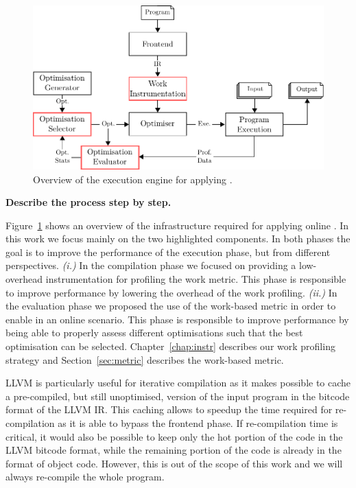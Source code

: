 \begin{figure}[htb]
    \centering
    \includegraphics[width=\linewidth]{figs/infra-diagram}
    \caption{Overview of the execution engine for applying {\itercomp}.}
    \label{fig:infra-diagram}
\end{figure}
\textbf{Describe the process step by step.}

Figure~\ref{fig:infra-diagram} shows an overview of the infrastructure required for applying online {\itercomp}.
In this work we focus mainly on the two highlighted components.
In both phases the goal is to improve the performance of the execution phase, but from different perspectives.
\textit{(i.)} In the compilation phase we focused on providing a low-overhead instrumentation for profiling the work metric. This phase is responsible to improve performance by lowering the overhead of the work profiling.
\textit{(ii.)} In the evaluation phase we proposed the use of the work-based metric in order to enable {\itercomp} in an online scenario. This phase is responsible to improve performance by being able to properly assess different optimisations such that the best optimisation can be selected.
Chapter~\ref{chap:instr} describes our work profiling strategy and Section~\ref{sec:metric} describes the work-based metric.

LLVM is particularly useful for iterative compilation as it makes possible to cache a pre-compiled, but still unoptimised, version of the input program in the bitcode format of the LLVM IR.  
This caching allows to speedup the time required for re-compilation as it is able to bypass the frontend phase.
If re-compilation time is critical, it would also be possible to keep only the hot portion of the code in the LLVM bitcode format, while the remaining portion of the code is already in the format of object code.
However, this is out of the scope of this work and we will always re-compile the whole program.


